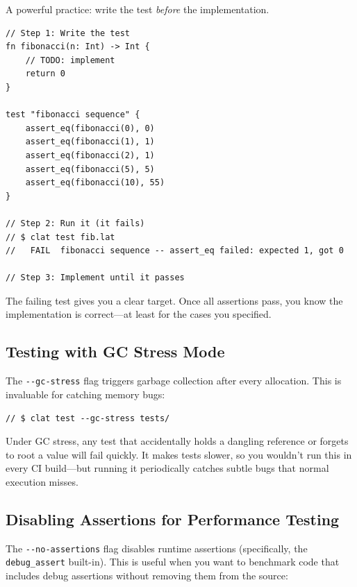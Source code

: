 A powerful practice: write the test \emph{before} the implementation.

\begin{lstlisting}[language=Lattice, caption={Writing the test first}]
// Step 1: Write the test
fn fibonacci(n: Int) -> Int {
    // TODO: implement
    return 0
}

test "fibonacci sequence" {
    assert_eq(fibonacci(0), 0)
    assert_eq(fibonacci(1), 1)
    assert_eq(fibonacci(2), 1)
    assert_eq(fibonacci(5), 5)
    assert_eq(fibonacci(10), 55)
}

// Step 2: Run it (it fails)
// $ clat test fib.lat
//   FAIL  fibonacci sequence -- assert_eq failed: expected 1, got 0

// Step 3: Implement until it passes
\end{lstlisting}

The failing test gives you a clear target.
Once all assertions pass, you know the implementation is correct---at least for the cases you specified.

\subsection{Testing with GC Stress Mode}\label{sec:gc-stress}

The \lstinline|--gc-stress| flag triggers garbage collection after every allocation.
This is invaluable for catching memory bugs:

\begin{lstlisting}[language=Lattice, caption={Running tests with GC stress}]
// $ clat test --gc-stress tests/
\end{lstlisting}

Under GC stress, any test that accidentally holds a dangling reference or forgets to root a value will fail quickly.
It makes tests slower, so you wouldn't run this in every CI build---but running it periodically catches subtle bugs that normal execution misses.

\subsection{Disabling Assertions for Performance Testing}\label{sec:no-assertions}

The \lstinline|--no-assertions| flag disables runtime assertions (specifically, the \lstinline|debug_assert| built-in).
This is useful when you want to benchmark code that includes debug assertions without removing them from the source:


